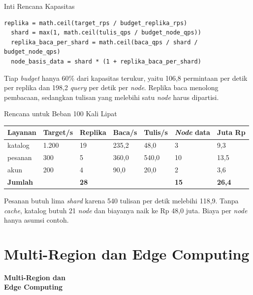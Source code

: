 \documentclass[aspectratio=169, table, 12pt]{beamer}
\begin{document}
\begin{frame}[fragile]{{\Large Inti Rencana Kapasitas}}
  \vspace{2pt}
\begin{lstlisting}[style=PythonStyle]
  replika = math.ceil(target_rps / budget_replika_rps)
  shard = max(1, math.ceil(tulis_qps / budget_node_qps))
  replika_baca_per_shard = math.ceil(baca_qps / shard / budget_node_qps)
  node_basis_data = shard * (1 + replika_baca_per_shard)
\end{lstlisting}
  \vspace{4pt}
  {\small Tiap \textit{budget} hanya 60\% dari kapasitas terukur, yaitu 106,8
  permintaan per detik per replika dan 198,2 \textit{query} per detik per
  \textit{node}. Replika baca menolong pembacaan, sedangkan tulisan yang
  melebihi satu \textit{node} harus dipartisi.}
\end{frame}

\begin{frame}{{\Large Rencana untuk Beban 100 Kali Lipat}}
  \vspace{6pt}
  \centering
  {\footnotesize
  \begin{tabularx}{\textwidth}{Yllllll}
    \hline
    \textbf{Layanan} & \textbf{Target/s} & \textbf{Replika} & \textbf{Baca/s} & \textbf{Tulis/s} & \textbf{\textit{Node} data} & \textbf{Juta Rp} \\
    \hline
    katalog & 1.200 & 19 & 235,2 & 48,0 & 3 & 9,3 \\
    \hline
    pesanan & 300 & 5 & 360,0 & 540,0 & 10 & 13,5 \\
    \hline
    akun & 200 & 4 & 90,0 & 20,0 & 2 & 3,6 \\
    \hline
    \textbf{Jumlah} & & \textbf{28} & & & \textbf{15} & \textbf{26,4} \\
    \hline
  \end{tabularx}}

  \vspace{6pt}
  {\small Pesanan butuh lima \textit{shard} karena 540 tulisan per detik
  melebihi 118,9. Tanpa \textit{cache}, katalog butuh 21 \textit{node} dan
  biayanya naik ke Rp 48,0 juta. Biaya per \textit{node} hanya asumsi
  contoh.}
\end{frame}

\section{Multi-Region dan Edge Computing}

\begin{frame}{\hfill}
  \centering
  \Huge{\textbf{Multi-Region dan\\Edge Computing}}
\end{frame}
\end{document}
